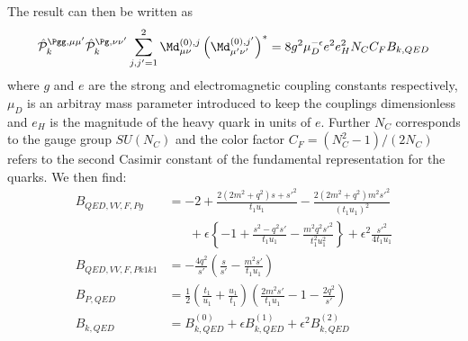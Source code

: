 The result can then be written as
\begin{equation}
\hat {\mathcal P}_{k}^{\Pgg,\mu\mu'}\hat {\mathcal P}_{k}^{\Pg,\nu\nu'}\sum_{j,j'=1}^2\Md^{(0),j}_{\mu\nu}\left(\Md^{(0),j'}_{\mu'\nu'}\right)^* = 8g^2\mu_D^{-\epsilon}e^2e_H^2 N_C C_F B_{k,QED}
\end{equation}
where $g$ and $e$ are the strong and electromagnetic coupling constants respectively, $\mu_D$ is an arbitray mass parameter introduced to keep the couplings dimensionless and $e_H$ is the magnitude of the heavy quark in units of $e$. Further $N_C$ corresponds to the gauge group $SU(N_C)$ and the color factor $C_F=(N_C^2-1)/(2N_C)$ refers to the second Casimir constant of the fundamental representation for the quarks. We then find:
\begin{align}
B_{QED,VV,F,Pg} &= -2 + \frac{2(2m^2+q^2)s+s'^2}{t_1u_1} - \frac{2(2m^2+q^2)m^2s'^2}{(t_1 u_1)^2}\nonumber\\
 &\hspace{20pt}+\epsilon\left\{ -1 + \frac{s^2-q^2s'}{t_1u_1} - \frac{m^2q^2{s'}^2}{t_1^2u_1^2} \right\} + \epsilon^2\frac{{s'}^2}{4t_1u_1}\\
B_{QED,VV,F,Pk1k1} &= -\frac{4q^2}{s'}\left(\frac s {s'} - \frac{m^2s'}{t_1u_1}\right)\\
B_{P,QED} &= \frac 1 2\left(\frac{t_1}{u_1}+\frac{u_1}{t_1}\right)\left(\frac{2m^2 s'}{t_1u_1}-1 - \frac{2q^2}{s'}\right)\\
B_{k,QED} &= B^{(0)}_{k,QED} + \epsilon B^{(1)}_{k,QED} + \epsilon^2 B^{(2)}_{k,QED}
\end{align}

